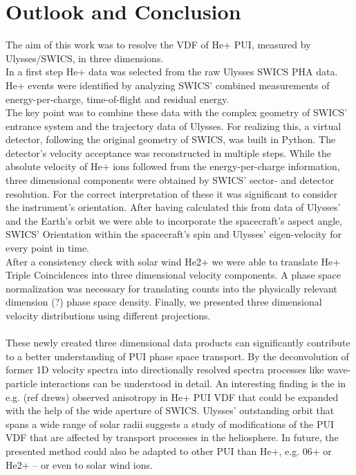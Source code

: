 
\chapter{Outlook and Conclusion} %

\label{chap:concl} %



The aim of this work was to resolve the VDF of He+ PUI, measured by Ulysses/SWICS, in three dimensions.\\
In a first step He+ data was selected from the raw Ulysses SWICS PHA data. He+ events were identified by analyzing SWICS' combined measurements of energy-per-charge, time-of-flight and residual energy.\\
The key point was to combine these data with the complex geometry of SWICS' entrance system and the trajectory data of Ulysses. For realizing this, a virtual detector, following the original geometry of SWICS, was built in Python. The detector's velocity acceptance was reconstructed in multiple steps. While the absolute velocity of He+ ions followed from the energy-per-charge information, three dimensional components were obtained by SWICS' sector- and detector resolution. For the correct interpretation of these it was significant to consider the instrument's orientation. After having calculated this from data of Ulysses' and the Earth's orbit we were able to incorporate the spacecraft's aspect angle, SWICS' Orientation within the spacecraft's spin and Ulysses' eigen-velocity for every point in time.\\
After a consistency check with solar wind He2+ we were able to translate He+ Triple Coincidences into three dimensional velocity components.
A phase space normalization was necessary for translating counts into the physically relevant dimension (?) phase space density.
Finally, we presented three dimensional velocity distributions using different projections. 
\\ \\
These newly created three dimensional data products can significantly contribute to a better understanding of PUI phase space transport. By the deconvolution of former 1D velocity spectra into directionally resolved spectra processes like wave-particle interactions can be understood in detail. An interesting finding is the in e.g. (ref drews) observed anisotropy in He+ PUI VDF that could be expanded with the help of the wide aperture of SWICS. 
Ulysses' outstanding orbit that spans a wide range of solar radii suggests a study of modifications of the PUI VDF that are affected by transport processes in the heliosphere.
In future, the presented method could also be adapted to other PUI than He+, e.g. 06+ or He2+ -- or even to solar wind ions. \\





